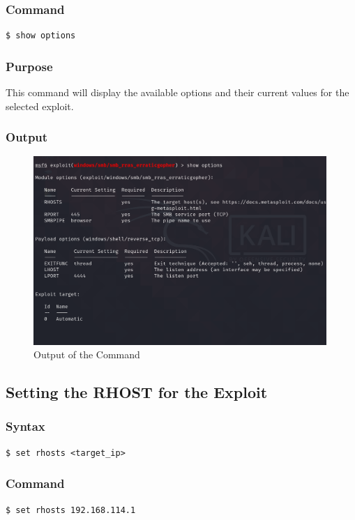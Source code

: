 \documentclass[11pt]{article}
\begin{document}
\subsubsection*{Command}
\begin{verbatim}
$ show options
\end{verbatim}

\subsubsection*{Purpose}
This command will display the available options and their current values for the selected exploit.
\subsubsection*{Output}
\begin{figure}[H]
    \centering
    \includegraphics[width=0.99\textwidth]{a3_ss (21).png}
    \caption{Output of the Command}
\end{figure}
\subsection{Setting the RHOST for the Exploit}

\subsubsection*{Syntax}
\begin{verbatim}
$ set rhosts <target_ip>
\end{verbatim}

\subsubsection*{Command}
\begin{verbatim}
$ set rhosts 192.168.114.1
\end{verbatim}
\end{document}
